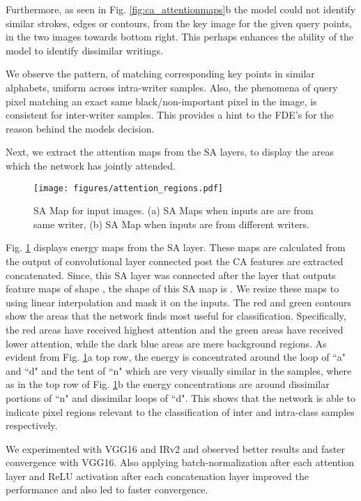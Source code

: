 \documentclass[a4paper,conference]{IEEEtran}
\begin{document}
Furthermore, as seen in Fig. \ref{fig:ca_attentionmaps}b the model could not identify similar strokes, edges or contours, from the key image for the given query points, in the two images towards bottom right. This perhaps enhances the ability of the model to identify dissimilar writings. 

We observe the pattern, of matching corresponding key points in similar alphabets, uniform across intra-writer samples. Also, the phenomena of query pixel matching an exact same black/non-important pixel in the image, is consistent for inter-writer samples. This provides a hint to the FDE's for the reason behind the models decision.

Next, we extract the attention maps from the SA layers, to display the areas which the network has jointly attended.
\begin{figure}[!h]
\begin{center}
\texttt{[image: figures/attention\_regions.pdf]}
\caption{\label{fig:sa_attentionmaps} SA Map for input images. (a) SA Maps when inputs are are from same writer, (b) SA Map when inputs are from different writers.}
\end{center}
\end{figure}
Fig. \ref{fig:sa_attentionmaps} displays energy maps from the SA layer. These maps are calculated from the output of convolutional layer connected post the CA features are extracted concatenated. Since, this SA layer was connected after the layer that outputs feature maps of shape , the shape of this SA map is . We resize these maps to  using linear interpolation and mask it on the inputs. The red and green contours show the areas that the network finds most useful for classification. Specifically, the red areas have received highest attention and the green areas have received lower attention, while the dark blue areas are mere background regions. As evident from Fig. \ref{fig:sa_attentionmaps}a top row, the energy is concentrated around the loop of ``a" and ``d" and the tent of ``n" which are very visually similar in the samples, where as in the top row of Fig. \ref{fig:sa_attentionmaps}b the energy concentrations are around dissimilar portions of ``n" and dissimilar loops of ``d". This shows that the network is able to indicate pixel regions relevant to the classification of inter and intra-class samples respectively.

We experimented with VGG16 and IRv2 and observed better results and faster convergence with VGG16. Also applying batch-normalization after each attention layer and ReLU activation after each concatenation layer improved the performance and also led to faster convergence.
\end{document}
